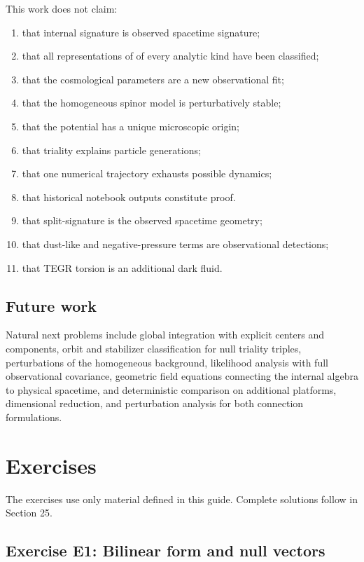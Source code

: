\documentclass[11pt]{article}
\begin{document}
This work does not claim:

\begin{enumerate}
\item that internal signature \texttt{} is observed spacetime signature;
\item that all representations of \texttt{} of every analytic kind have been
classified;

\item that the cosmological parameters are a new observational fit;
\item that the homogeneous spinor model is perturbatively stable;
\item that the potential has a unique microscopic origin;
\item that triality explains particle generations;
\item that one numerical trajectory exhausts possible dynamics;
\item that historical notebook outputs constitute proof.
\item that split-signature \texttt{} is the observed spacetime geometry;
\item that dust-like and negative-pressure terms are observational detections;
\item that TEGR torsion is an additional dark fluid.
\end{enumerate}

\subsection{Future work}

Natural next problems include global integration with explicit centers and components, orbit and stabilizer classification for null triality triples, perturbations of the homogeneous background, likelihood analysis with full observational covariance, geometric field equations connecting the internal algebra to physical spacetime, and deterministic comparison on additional platforms, dimensional reduction, and perturbation analysis for both connection formulations.

\section{Exercises}

The exercises use only material defined in this guide. Complete solutions follow in Section 25.

\subsection{Exercise E1: Bilinear form and null vectors}
\end{document}
